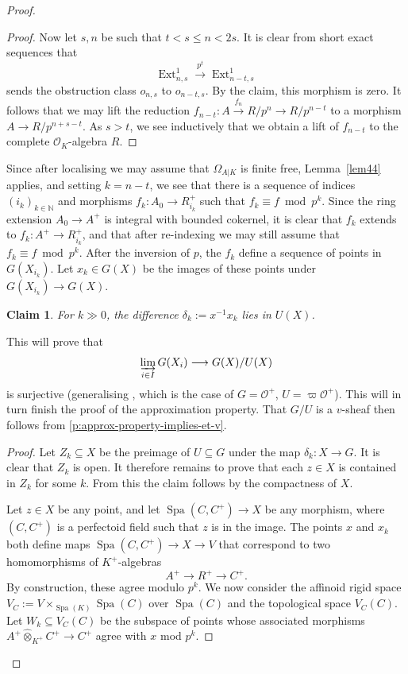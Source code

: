 \documentclass[11pt]{amsart}
\numberwithin{equation}{section}
\newtheorem{Claim}[thm]{Claim}
\theoremstyle{definition}
\theoremstyle{remark}
\newcommand{\lra}{\longrightarrow}
\newcommand{\N}{\mathbb{N}}
\renewcommand{\O}{\mathcal{O}}
\newcommand{\Spa}{\operatorname{Spa}}
\newcommand{\Ext}{\operatorname{Ext}}
\begin{document}
\begin{proof}
\begin{proof}
 		Now let  $s,n$ be such that $t<s\leq n< 2s$. It is clear from short exact sequences  that
 		\[ \Ext_{n,s}^1\overset{p^t}\lra\Ext_{n-t,s}^1\]
 		sends the obstruction class $o_{n,s}$ to $o_{n-t,s}$. By the claim, this morphism is zero. It follows that we may lift the reduction $f_{n-t}\colon A\xrightarrow{f_n} R/p^n\to R/p^{n-t}$ to a morphism $A\to R/p^{n+s-t}$. As $s>t$, we see inductively that we obtain a lift of $f_{n-t}$ to the complete $\O_K$-algebra $R$.
 	\end{proof}
        
	Since after localising we may assume that $\Omega_{A|K}$ is finite free, Lemma~\ref{lem44}  applies, and setting $k=n-t$, we see that there is a sequence of indices $(i_k)_{k\in \N}$ and morphisms $f_k\colon A_0\to R^+_{i_k}$ such that $f_k\equiv f\bmod p^k$. Since the ring extension $A_0\to A^+$ is integral with bounded cokernel, it is clear that $f_k$ extends to $f_k\colon A^+\to R^+_{i_k}$, and that after re-indexing we may still assume that $f_k\equiv f\bmod p^k$. After the inversion of $p$, the $f_k$ define a sequence of points in $G(X_{i_k})$. Let $x_{k}\in G(X)$ be the images of these points under $G(X_{i_k})\to G(X)$.
        
	\begin{Claim}\label{cl:diff-in-U(X)}
		For $k\gg 0$, the difference $\delta_k:=x^{-1}x_k$ lies in $U(X)$.
	\end{Claim}

        This will prove that
	\[ \varinjlim_{i\in I} G(X_i)\lra G(X)/U(X)\]
	is surjective (generalising \cite[Lemma~3.10]{heuer-diamantine-Picard}, which is the case of $G=\O^+$, $U=\varpi\O^+$). This will in turn finish the proof of the approximation property. That $G/U$ is a $v$-sheaf then follows from \cref{p:approx-property-implies-et-v}.

        \begin{proof}
		Let $Z_k\subseteq X$ be the preimage of $U\subseteq G$ under the map
		$\delta_k\colon X\to G$.
		It is clear that $Z_k$ is open. It therefore remains to prove that each $z\in X$ is contained in $Z_k$ for some $k$. From this the claim follows by the compactness of $X$.
		
		Let $z\in X$ be any point, and let $\Spa(C,C^+)\to X$ be any morphism, where $(C,C^+)$ is a perfectoid field such that $z$ is in the image. The points $x$ and $x_k$ both define maps
		$\Spa(C,C^+)\to X\to V$
		that correspond to two homomorphisms of $K^+$-algebras
		\[ A^+\lra R^+\lra C^+.\]
		By construction, these agree modulo $p^k$. 
		We now consider the affinoid rigid space $V_C:=V\times_{\Spa(K)}\Spa(C)$ over $\Spa(C)$ and the topological space $V_C(C)$. Let $W_k\subseteq V_C(C)$ be the subspace of points whose associated morphisms $A^+\hat{\otimes}_{K^+}C^+\to C^+$ agree with $x$ mod $p^k$.
                

\end{proof}
\end{proof}
\end{document}
